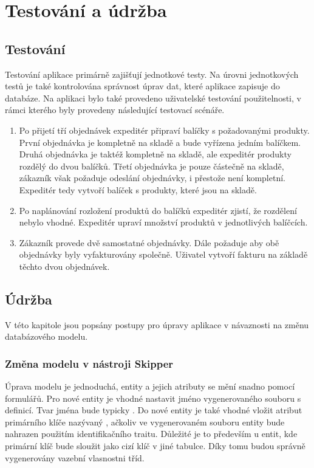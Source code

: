 \documentclass[thesis=B,czech]{FITthesis}[2012/06/26]
\begin{document}
\chapter{Testování a údržba}

\section{Testování}
	Testování aplikace primárně zajišťují jednotkové testy. Na úrovni jednotkových testů je také kontrolována správnost úprav dat, které aplikace zapisuje do databáze. Na aplikaci bylo také provedeno uživatelské testování použitelnosti, v rámci kterého byly provedeny následující testovací scénáře.
	\begin{enumerate}
		\item Po přijetí tří objednávek expeditér připraví balíčky s požadovanými produkty. První objednávka je kompletně na skladě a bude vyřízena jedním balíčkem. Druhá objednávka je taktéž kompletně na skladě, ale expeditér produkty rozdělý do dvou balíčků. Třetí objednávka je pouze částečně na skladě, zákazník však požaduje odeslání objednávky, i přestože není kompletní. Expeditér tedy vytvoří balíček s produkty, které jsou na skladě.
		\item Po naplánování rozložení produktů do balíčků expeditér zjistí, že rozdělení nebylo vhodné. Expeditér upraví množství produktů v jednotlivých balíčcích.
		\item Zákazník provede dvě samostatné objednávky. Dále požaduje aby obě objednávky byly vyfakturovány společně. Uživatel vytvoří fakturu na základě těchto dvou objednávek.
	\end{enumerate}

\section{Údržba}
	V této kapitole jsou popsány postupy pro úpravy aplikace v návaznosti na změnu databázového modelu.
\subsection{Změna modelu v nástroji Skipper}
	Úprava modelu je jednoduchá, entity a jejich atributy se mění snadno pomocí formulářů. Pro nové entity je vhodné nastavit jméno vygenerovaného souboru s definicí. Tvar jména bude typicky . Do nové entity je také vhodné vložit atribut primárního klíče nazývaný , ačkoliv ve vygenerovaném souboru entity bude nahrazen použitím identifikačního traitu. Důležité je to především u entit, kde primární klíč bude sloužit jako cizí klíč v jiné tabulce. Díky tomu budou správně vygenerovány vazební vlasnostni tříd.
\end{document}
